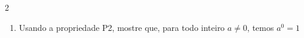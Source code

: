 \documentclass[a4paper,14pt]{article}
\begin{document}
\begin{multicols}{2}
\begin{enumerate}
\begin{enumerate}[a)]
    			\item $\frac{(-6)^{17} \cdot (-6)^5}{(-6)^8 \cdot (-6)^{12}}$ \\\\\\\\\\\\\\\\\\\\
    			\item $\frac{y^{15} \cdot y^{16}}{y^{18} \cdot y^9}$ \\\\\\\\\\\\\\\\\\\\
    			\item $\frac{9^6 \cdot 9^3 \cdot 9^7}{9^4 \cdot 9^5}$ \newpage
    			\item $\frac{x^{23} \cdot x^4 \cdot x^8}{x^{13} \cdot x^{11}}$ \\\\\\\\\\\\\\\\\\\\
    			\item $\frac{(-5)^{14} \cdot (-5)^0}{(-5)^8 \cdot (-5)^3}$ \\\\\\\\\\\\\\\\\\\\
    		\end{enumerate}
    		\item Usando a propriedade P2, mostre que, para todo inteiro $a \neq 0$, temos $a^0 = 1$ \\\\\\\\\\\\\\\\\\\\

\end{enumerate}
\end{multicols}
\end{document}
